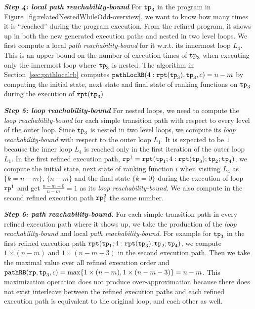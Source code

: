 \textbf{\emph{Step 4: local path reachability-bound}}
For $\mathtt{tp}_3$ in the program in Figure~\ref{fig:relatedNestedWhileOdd-overview}, we want to know how many times it is ``reached'' during the program execution.
From the refined program, it shows up in both the new generated execution paths and nested in two level loops.
We first compute a local \emph{path reachability-bound} for it w.r.t. its innermost loop $L_4$.
This is an upper bound on the number of execution times of $\mathtt{tp}_3$ when executing only the innermost loop where $\mathtt{tp}_3$ is nested. The algorithm in Section~\ref{sec:pathlocalrb}
computes $\mathtt{pathLocRB}(4:\mathtt{rpt}(\mathtt{tp}_3), \mathtt{tp}_3, c) = n - m$ by computing
the initial state, next state and final state of ranking functions on $\mathtt{tp}_3$ during the execution of $\mathtt{rpt}(\mathtt{tp}_3)$.

\textbf{\emph{Step 5: loop reachability-bound}}
For nested loops, we need to compute the \emph{loop reachability-bound} for each simple transition path with respect to every level of the outer loop.
Since $\mathtt{tp}_3$ is nested in two level loops, we compute its \emph{loop reachability-bound}
with respect to the outer loop $L_1$. 
It is expected to be $1$ because the inner loop $L_4$ is reached only in the first iteration of the outer loop $L_1$.
In the first refined execution path, $\mathtt{rp}^1 = \mathtt{rpt}(\mathtt{tp}_1; 4:\mathtt{rpt}(\mathtt{tp}_3); \mathtt{tp}_2; \mathtt{tp}_4)$,
we compute the initial state, next state of ranking function $i$ when visiting $L_4$
as $\{ k = n - m\}$, $\{n - m\}$ and the final state $\{k = 0\}$
during the execution of loop $\mathtt{rp}^1$ and get
$\frac{n-m - 0}{n - m} = 1$ as its \emph{loop reachability-bound}.
We also compute in the second refined execution path $\mathtt{rp}_1^2$ the same number.

\textbf{\emph{Step 6: path reachability-bound.}}
For each simple transition path in every refined execution path where it shows up, we take the production of the \emph{loop reachability-bound}
and local \emph{path reachability-bound}.
For example for $\mathtt{tp}_3$ in the first refined execution path 
$\mathtt{rpt}(\mathtt{tp}_1; 4:\mathtt{rpt}(\mathtt{tp}_3); \mathtt{tp}_2; \mathtt{tp}_4)$,
we compute $1 \times (n - m)$ and $1 \times (n - m - 3)$ in the second execution path.
Then we
take the maximal value over all refined execution order and
$\mathtt{pathRB}(\mathtt{rp}, \mathtt{tp}_3, c) = \max\{ 1 \times (n - m), 1 \times (n - m - 3) \} = n - m$.
This maximization operation does not produce over-approximation because there does not exist interleave
between the refined execution paths and each refined execution path is equivalent to the original loop, and each other as well.

